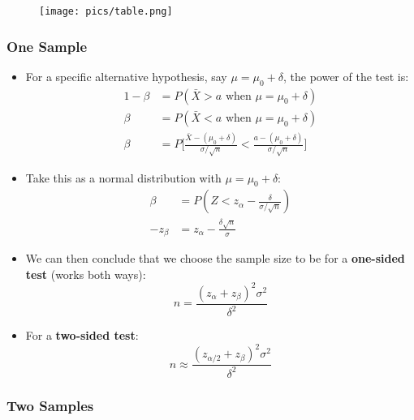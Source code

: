 \documentclass[10pt, letterpaper, twoside]{article}
\begin{document}
\begin{figure}[!ht]
    \texttt{[image: pics/table.png]}
\end{figure}
\begin{multicols}{2}

\subsubsection{One Sample}
    \begin{itemize}
        \item For a specific alternative hypothesis, say $\mu =\mu_0 + \delta$, the power of the test is:
        \begin{align*}
            1 - \beta &= P(\bar{X} > a \text{ when } \mu = \mu_0 +\delta) \\
            \beta &= P(\bar{X} < a \text{ when } \mu = \mu_0 +\delta)\\
            \beta &= P\Big[\frac{\bar{X} - (\mu_0+\delta)}{\sigma/\sqrt{n}}<\frac{a - (\mu_0+\delta)}{\sigma/\sqrt{n}}\big]
        \end{align*}
        \item Take this as a normal distribution with $\mu = \mu_0 +\delta$:
        \begin{align*}
            \beta &= P(Z < z_{\alpha} - \frac{\delta}{\sigma/\sqrt{n}})\\ 
            -z_{\beta} &= z_{\alpha} - \frac{\delta\sqrt{n}}{\sigma}
        \end{align*}
        \item We can then conclude that we choose the sample size to be for a \textbf{one-sided test} (works both ways):
        \begin{equation*}
            n = \frac{(z_{\alpha} + z_{\beta})^2\sigma^2}{\delta^2}
        \end{equation*}
        \item For a \textbf{two-sided test}:
        \begin{equation*}
            n \approx \frac{(z_{\alpha/2} + z_{\beta})^2\sigma^2}{\delta^2}
        \end{equation*}
    \end{itemize}

\subsubsection{Two Samples}


\end{multicols}
\end{document}
